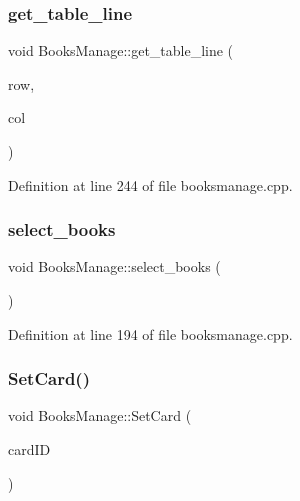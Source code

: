 \mbox{\label{class_books_manage_a0269967278f32edfd3f14ccff0a41715}} 
\subsubsection{\texorpdfstring{get\_table\_line}{get\_table\_line}}
{\footnotesize\ttfamily void Books\+Manage\+::get\+\_\+table\+\_\+line (\begin{DoxyParamCaption}\item[{int}]{row,  }\item[{int}]{col }\end{DoxyParamCaption})\hspace{0.3cm}{\ttfamily [slot]}}



Definition at line 244 of file booksmanage.\+cpp.

\mbox{\label{class_books_manage_ab2a76473efc3b68a9e1589cca6ab615d}} 
\subsubsection{\texorpdfstring{select\_books}{select\_books}}
{\footnotesize\ttfamily void Books\+Manage\+::select\+\_\+books (\begin{DoxyParamCaption}{ }\end{DoxyParamCaption})\hspace{0.3cm}{\ttfamily [slot]}}



Definition at line 194 of file booksmanage.\+cpp.

\mbox{\label{class_books_manage_a009c231a6f8976be927b7acfdc4d4591}} 
\subsubsection{\texorpdfstring{SetCard()}{SetCard()}}
{\footnotesize\ttfamily void Books\+Manage\+::\+Set\+Card (\begin{DoxyParamCaption}\item[{Q\+String}]{card\+ID }\end{DoxyParamCaption})}



